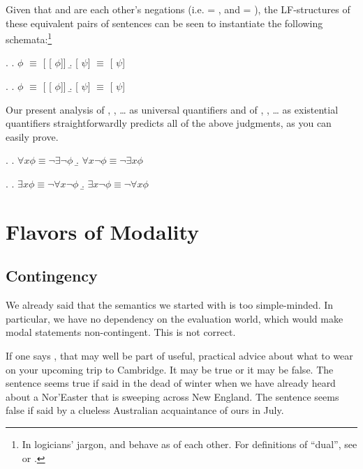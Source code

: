 Given that  and  are each other's
negations (i.e.  = , and  =
), the LF-structures of these equivalent pairs of
sentences can be seen to instantiate the following
schemata:\footnote{In logicians' jargon,  and
   behave as  of each other. For
  definitions of ``dual'', see
  \citet[197]{barwise-cooper:1981:generalized} or
  \citet[vol.2,238]{gamut:91}.}

\ex. \a.  $\phi$ $\equiv$  [ [ $\phi$]] \b.  [ \ensuremath{\psi}] $\equiv$  [ \ensuremath{\psi}]

\ex. \a.  $\phi$ $\equiv$  [ [ $\phi$]] \b.  [ \ensuremath{\psi}] $\equiv$  [ \ensuremath{\psi}]

Our present analysis of , ,
\dots{} as universal quantifiers and of ,
, \dots{} as existential quantifiers straightforwardly
predicts all of the above judgments, as you can easily
prove.

\ex. \a. $\forall x \phi \equiv \neg \exists \neg \phi$ \b. $\forall x \neg \phi \equiv \neg \exists x \phi$

\ex. \a. $\exists x \phi \equiv \neg \forall x \neg \phi$ \b. $\exists x \neg \phi \equiv \neg \forall x \phi$

\section{Flavors of Modality} \label{sec:flavors}

\subsection{Contingency} \label{sec:contingency}

We already said that the semantics we started with is too
simple-minded. In particular, we have no dependency on the evaluation
world, which would make modal statements non-contingent. This is not
correct.

If one says , that may well
be part of useful, practical advice about what to wear on your
upcoming trip to Cambridge. It may be true or it may be false. The
sentence seems true if said in the dead of winter when we have already
heard about a Nor'Easter that is sweeping across New England. The
sentence seems false if said by a clueless Australian acquaintance of
ours in July.


